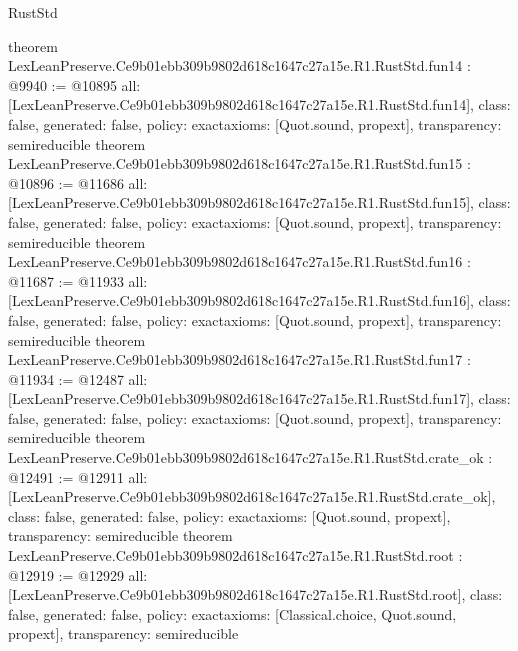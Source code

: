 \begin{lexlean}{RustStd}
\begin{coremodule}
{}
theorem LexLeanPreserve.Ce9b01ebb309b9802d618c1647c27a15e.R1.RustStd.fun14 : @9940 := @10895 {
  all: [LexLeanPreserve.Ce9b01ebb309b9802d618c1647c27a15e.R1.RustStd.fun14],
  class: false,
  generated: false,
  policy: exact{axioms: [Quot.sound, propext]},
  transparency: semireducible
}
theorem LexLeanPreserve.Ce9b01ebb309b9802d618c1647c27a15e.R1.RustStd.fun15 : @10896 := @11686 {
  all: [LexLeanPreserve.Ce9b01ebb309b9802d618c1647c27a15e.R1.RustStd.fun15],
  class: false,
  generated: false,
  policy: exact{axioms: [Quot.sound, propext]},
  transparency: semireducible
}
theorem LexLeanPreserve.Ce9b01ebb309b9802d618c1647c27a15e.R1.RustStd.fun16 : @11687 := @11933 {
  all: [LexLeanPreserve.Ce9b01ebb309b9802d618c1647c27a15e.R1.RustStd.fun16],
  class: false,
  generated: false,
  policy: exact{axioms: [Quot.sound, propext]},
  transparency: semireducible
}
theorem LexLeanPreserve.Ce9b01ebb309b9802d618c1647c27a15e.R1.RustStd.fun17 : @11934 := @12487 {
  all: [LexLeanPreserve.Ce9b01ebb309b9802d618c1647c27a15e.R1.RustStd.fun17],
  class: false,
  generated: false,
  policy: exact{axioms: [Quot.sound, propext]},
  transparency: semireducible
}
theorem LexLeanPreserve.Ce9b01ebb309b9802d618c1647c27a15e.R1.RustStd.crate_ok : @12491 := @12911 {
  all: [LexLeanPreserve.Ce9b01ebb309b9802d618c1647c27a15e.R1.RustStd.crate_ok],
  class: false,
  generated: false,
  policy: exact{axioms: [Quot.sound, propext]},
  transparency: semireducible
}
theorem LexLeanPreserve.Ce9b01ebb309b9802d618c1647c27a15e.R1.RustStd.root : @12919 := @12929 {
  all: [LexLeanPreserve.Ce9b01ebb309b9802d618c1647c27a15e.R1.RustStd.root],
  class: false,
  generated: false,
  policy: exact{axioms: [Classical.choice, Quot.sound, propext]},
  transparency: semireducible
}


\end{coremodule}
\end{lexlean}
